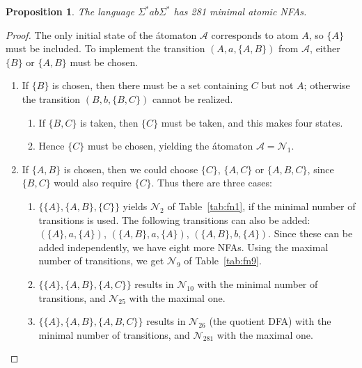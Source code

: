 \documentclass[preprint,12pt]{elsarticle}
\newcommand{\Sig}{\Sigma}
\newcommand{\be}{\begin{enumerate}}
\newcommand{\ee}{\end{enumerate}}
\newcommand{\cA}{{\mathcal A}}
\newcommand{\cN}{{\mathcal N}}
\newtheorem{proposition}{Proposition}
\begin{document}
\begin{proposition} 
\label{prop:281}
The language $\Sig^*ab\Sig^*$ has 281 minimal atomic NFAs. 
\end{proposition}
\begin{proof}

The only initial state of the \'atomaton $\cA$ corresponds to atom $A$, 
so $\{A\}$ must be included.
To implement the transition
$(A,a,\{A,B\})$ from $\cA$,
either $\{B\}$ or $\{A,B\}$ must be chosen. 
\be
\item
If $\{B\}$ is chosen, then there must be a set containing $C$ but not $A$; otherwise 
the transition 
 $(B,b,\{B,C\})$ cannot be realized.
        \be
        \item
        If $\{B,C\}$ is taken, then $\{C\}$ must be taken, and this makes four states.
        \item
         Hence $\{C\}$ must be chosen, yielding the \'atomaton $\cA=\cN_1$.
         \ee
\item
If $\{A,B\}$ is chosen, then we could choose $\{C\}$, $\{A,C\}$ or $\{A,B,C\}$, 
since $\{B,C\}$ would also require $\{C\}$. Thus there are three cases:
        \be
        \item
        $\{\{A\},\{A,B\},\{C\}\}$ yields $\cN_2$ of Table~\ref{tab:fn1}, if the minimal number of 
        transitions is used. 
        The following transitions can also be added: 
        $(\{A\},a,\{A\})$, $(\{A,B\},a,\{A\})$, $(\{A,B\},b,\{A\})$.
        Since these can be added independently, we have eight more NFAs. 
        Using the maximal number of transitions, we get $\cN_9$ of Table~\ref{tab:fn9}.
        \item
        $\{\{A\},\{A,B\},\{A,C\}\}$ results in $\cN_{10}$ with the minimal number 
          of transitions, and $\cN_{25}$ with the maximal one.
        \item
        $\{\{A\},\{A,B\},\{A,B,C\}\}$ results in $\cN_{26}$ (the quotient DFA) 
          with the minimal number of transitions, and  $\cN_{281}$ with the maximal one.
        \ee
\ee


\end{proof}
\end{document}
